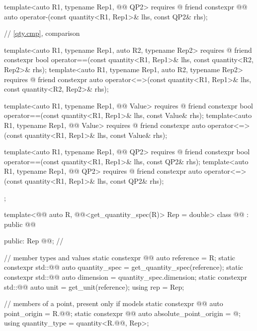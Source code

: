 \begin{codeblock}
{{  template<auto R1, typename Rep1, @@ QP2>
    requires @\seebelownc@
  friend constexpr @@ auto operator-(const quantity<R1, Rep1>& lhs, const QP2& rhs);


  // \ref{qty.cmp}, comparison

  template<auto R1, typename Rep1, auto R2, typename Rep2>
    requires @\seebelownc@
  friend constexpr bool operator==(const quantity<R1, Rep1>& lhs,
                                   const quantity<R2, Rep2>& rhs);
  template<auto R1, typename Rep1, auto R2, typename Rep2>
    requires @\seebelownc@
  friend constexpr auto operator<=>(const quantity<R1, Rep1>& lhs,
                                    const quantity<R2, Rep2>& rhs);

  template<auto R1, typename Rep1, @@ Value>
    requires @\seebelownc@
  friend constexpr bool operator==(const quantity<R1, Rep1>& lhs, const Value& rhs);
  template<auto R1, typename Rep1, @@ Value>
    requires @\seebelownc@
  friend constexpr auto operator<=>(const quantity<R1, Rep1>& lhs, const Value& rhs);

  template<auto R1, typename Rep1, @@ QP2>
    requires @\seebelownc@
  friend constexpr bool operator==(const quantity<R1, Rep1>& lhs, const QP2& rhs);
  template<auto R1, typename Rep1, @@ QP2>
    requires @\seebelownc@
  friend constexpr auto operator<=>(const quantity<R1, Rep1>& lhs, const QP2& rhs);
};

template<@@ auto R, @@<get_quantity_spec(R)> Rep = double>
class @@ : public @@ {
public:
  Rep @@;  // \expos

  // member types and values
  static constexpr @@ auto reference = R;
  static constexpr std::@@ auto quantity_spec = get_quantity_spec(reference);
  static constexpr std::@@ auto dimension = quantity_spec.dimension;
  static constexpr std::@@ auto unit = get_unit(reference);
  using rep = Rep;

  // members of a point, present only if  models 
  static constexpr @@ auto point_origin = R.@@;
  static constexpr @@ auto absolute_point_origin = @\seebelownc@;
  using quantity_type = quantity<R.@@, Rep>;

}}
\end{codeblock}
